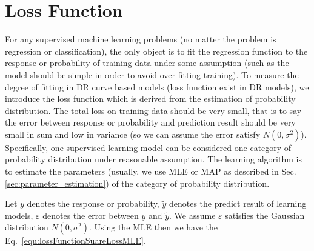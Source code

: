 \documentclass[runningheads,openany]{xhlPaper}
\begin{document}
\section{Loss Function}
\label{sec:lossFunction}
For any supervised machine learning problems (no matter the problem is regression or classification), the only object is to fit the regression function to the response or probability of training data under some assumption (such as the model should be simple in order to avoid over-fitting training). To measure the degree of fitting in DR curve based models (loss function exist in DR models), we introduce the loss function which is derived from the estimation of probability distribution. The total loss on training data should be very small, that is to say the error between response or probability and prediction result should be very small in sum and low in variance (so we can assume the error satisfy $N\left( 0, \sigma ^2 \right)$). Specifically, one supervised learning model can be considered one category of probability distribution under reasonable assumption. The learning algorithm is to estimate the parameters (usually, we use MLE or MAP as described in Sec.\ref{sec:parameter_estimation}) of the category of probability distribution. 

Let $y$ denotes the response or probability, $\tilde{y}$ denotes the predict result of learning models, $\varepsilon$ denotes the error between $y$ and $\tilde{y}$. We assume $\varepsilon$ satisfies the Gaussian distribution $N\left( {0,{\sigma ^2}} \right)$. Using the MLE then we have the Eq.~\ref{equ:lossFunctionSuareLossMLE}.
\end{document}
